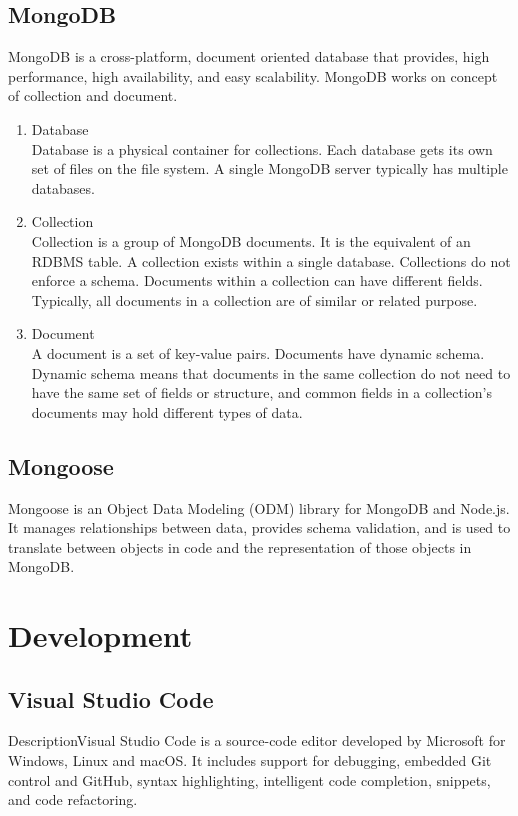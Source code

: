 \subsection{MongoDB}
MongoDB is a cross-platform, document oriented database that provides, high performance, high availability, and easy scalability. MongoDB works on concept of collection and document.
\begin{enumerate}
    \item
          Database\\
          Database is a physical container for collections. Each database gets its own set of files on the file system. A single MongoDB server typically has multiple databases.
    \item
          Collection\\
          Collection is a group of MongoDB documents. It is the equivalent of an RDBMS table. A collection exists within a single database. Collections do not enforce a schema. Documents within a collection can have different fields. Typically, all documents in a collection are of similar or related purpose.
    \item
          Document\\
          A document is a set of key-value pairs. Documents have dynamic schema. Dynamic schema means that documents in the same collection do not need to have the same set of fields or structure, and common fields in a collection's documents may hold different types of data.
\end{enumerate}





\subsection{Mongoose}
Mongoose is an Object Data Modeling (ODM) library for MongoDB and Node.js. It manages relationships between data, provides schema validation, and is used to translate between objects in code and the representation of those objects in MongoDB.


\section{Development}
\subsection{Visual Studio Code}
DescriptionVisual Studio Code is a source-code editor developed by Microsoft for Windows, Linux and macOS. It includes support for debugging, embedded Git control and GitHub, syntax highlighting, intelligent code completion, snippets, and code refactoring.


